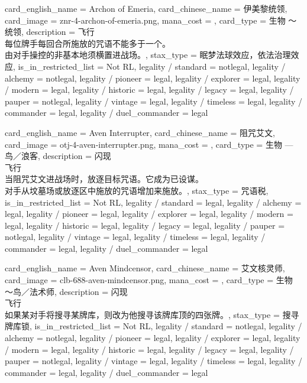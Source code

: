 \documentclass[lang = cn, color = black, 10pt]{AllThatStax}
\begin{document}
\card
{
	card_english_name = {Archon of Emeria},
	card_chinese_name = {伊美黎统领},
	card_image = znr-4-archon-of-emeria.png,
	mana_cost = ,
	card_type = 生物 ～统领,
	description = {飞行\\
		每位牌手每回合所施放的咒语不能多于一个。\\
		由对手操控的非基本地须横置进战场。},
	stax_type = 眠梦法球效应，依法治理效应,
	is_in_restricted_list = Not RL,
	legality / standard = notlegal,
	legality / alchemy = notlegal,
	legality / pioneer = legal,
	legality / explorer = legal,
	legality / modern = legal,
	legality / historic = legal,
	legality / legacy = legal,
	legality / pauper = notlegal,
	legality / vintage = legal,
	legality / timeless = legal,
	legality / commander = legal,
	legality / duel_commander = legal
}

\card
{
	card_english_name = {Aven Interrupter},
	card_chinese_name = {阻咒艾文},
	card_image = otj-4-aven-interrupter.png,
	mana_cost = ,
	card_type = 生物 — 鸟／浪客,
	description = {闪现\\
		飞行\\
		当阻咒艾文进战场时，放逐目标咒语。它成为已设谋。\\
		对手从坟墓场或放逐区中施放的咒语增加来施放。},
	stax_type = 咒语税,
	is_in_restricted_list = Not RL,
	legality / standard = legal,
	legality / alchemy = legal,
	legality / pioneer = legal,
	legality / explorer = legal,
	legality / modern = legal,
	legality / historic = legal,
	legality / legacy = legal,
	legality / pauper = notlegal,
	legality / vintage = legal,
	legality / timeless = legal,
	legality / commander = legal,
	legality / duel_commander = legal
}

\card
{
	card_english_name = {Aven Mindcensor},
	card_chinese_name = {艾文核灵师},
	card_image = clb-688-aven-mindcensor.png,
	mana_cost = ,
	card_type = 生物 ～鸟／法术师,
	description = {闪现\\
		飞行\\
		如果某对手将搜寻某牌库，则改为他搜寻该牌库顶的四张牌。},
	stax_type = 搜寻牌库锁,
	is_in_restricted_list = Not RL,
	legality / standard = notlegal,
	legality / alchemy = notlegal,
	legality / pioneer = legal,
	legality / explorer = legal,
	legality / modern = legal,
	legality / historic = legal,
	legality / legacy = legal,
	legality / pauper = notlegal,
	legality / vintage = legal,
	legality / timeless = legal,
	legality / commander = legal,
	legality / duel_commander = legal
}
\end{document}

